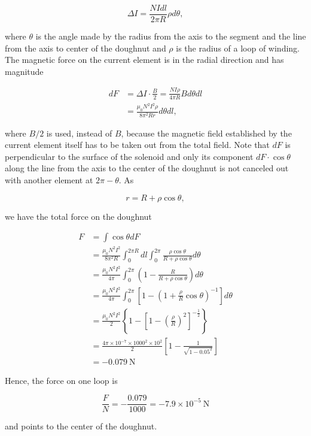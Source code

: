 \documentclass[10pt]{article}
\begin{document}
$$
\Delta I=\frac{N I d l}{2 \pi R} \rho d \theta,
$$

where $\theta$ is the angle made by the radius from the axis to the segment and the line from the axis to center of the doughnut and $\rho$ is the radius of a loop of winding. The magnetic force on the current element is in the radial direction and has magnitude

$$
\begin{aligned}
d F &=\Delta I \cdot \frac{B}{2}=\frac{N I \rho}{4 \pi R} B d \theta d l \\
&=\frac{\mu_{0} N^{2} I^{2} \rho}{8 \pi^{2} R r} d \theta d l,
\end{aligned}
$$

where $B / 2$ is used, instead of $B$, because the magnetic field established by the current element itself has to be taken out from the total field. Note that $d F$ is perpendicular to the surface of the solenoid and only its component $d F \cdot \cos \theta$ along the line from the axis to the center of the doughnut is not canceled out with another element at $2 \pi-\theta$. As

$$
r=R+\rho \cos \theta,
$$

we have the total force on the doughnut

$$
\begin{aligned}
F &=\int \cos \theta d F \\
&=\frac{\mu_{0} N^{2} I^{2}}{8 \pi^{2} R} \int_{0}^{2 \pi R} d l \int_{0}^{2 \pi} \frac{\rho \cos \theta}{R+\rho \cos \theta} d \theta \\
&=\frac{\mu_{0} N^{2} I^{2}}{4 \pi} \int_{0}^{2 \pi}\left(1-\frac{R}{R+\rho \cos \theta}\right) d \theta \\
&=\frac{\mu_{0} N^{2} I^{2}}{4 \pi} \int_{0}^{2 \pi}\left[1-\left(1+\frac{\rho}{R} \cos \theta\right)^{-1}\right] d \theta \\
&=\frac{\mu_{0} N^{2} I^{2}}{2}\left\{1-\left[1-\left(\frac{\rho}{R}\right)^{2}\right]^{-\frac{1}{2}}\right\} \\
&=\frac{4 \pi \times 10^{-7} \times 1000^{2} \times 10^{2}}{2}\left[1-\frac{1}{\sqrt{1-0.05^{2}}}\right] \\
&=-0.079 \mathrm{~N}
\end{aligned}
$$

Hence, the force on one loop is

$$
\frac{F}{N}=-\frac{0.079}{1000}=-7.9 \times 10^{-5} \mathrm{~N}
$$

and points to the center of the doughnut.
\end{document}

